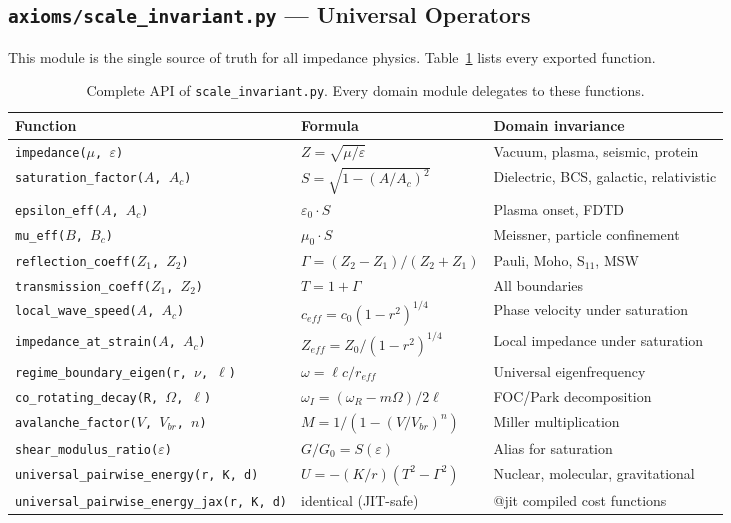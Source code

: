 \subsection{\texttt{axioms/scale\_invariant.py} --- Universal Operators}

This module is the single source of truth for all impedance physics.
Table~\ref{tab:scale_invariant_api} lists every exported function.

\begin{table}[H]
\centering\small
\caption{Complete API of \texttt{scale\_invariant.py}.
Every domain module delegates to these functions.}
\label{tab:scale_invariant_api}
\begin{tabularx}{\textwidth}{@{}lXl@{}}
\toprule
\textbf{Function} & \textbf{Formula} & \textbf{Domain invariance} \\
\midrule
\texttt{impedance($\mu$, $\varepsilon$)}
  & $Z = \sqrt{\mu/\varepsilon}$
  & Vacuum, plasma, seismic, protein \\
\texttt{saturation\_factor($A$, $A_c$)}
  & $S = \sqrt{1-(A/A_c)^2}$
  & Dielectric, BCS, galactic, relativistic \\
\texttt{epsilon\_eff($A$, $A_c$)}
  & $\varepsilon_0 \cdot S$
  & Plasma onset, FDTD \\
\texttt{mu\_eff($B$, $B_c$)}
  & $\mu_0 \cdot S$
  & Meissner, particle confinement \\
\texttt{reflection\_coeff($Z_1$, $Z_2$)}
  & $\Gamma = (Z_2-Z_1)/(Z_2+Z_1)$
  & Pauli, Moho, S$_{11}$, MSW \\
\texttt{transmission\_coeff($Z_1$, $Z_2$)}
  & $T = 1 + \Gamma$
  & All boundaries \\
\texttt{local\_wave\_speed($A$, $A_c$)}
  & $c_{eff} = c_0 (1-r^2)^{1/4}$
  & Phase velocity under saturation \\
\texttt{impedance\_at\_strain($A$, $A_c$)}
  & $Z_{eff} = Z_0 / (1-r^2)^{1/4}$
  & Local impedance under saturation \\
\texttt{regime\_boundary\_eigen(r, $\nu$, $\ell$)}
  & $\omega = \ell c / r_{eff}$
  & Universal eigenfrequency \\
\texttt{co\_rotating\_decay(R, $\Omega$, $\ell$)}
  & $\omega_I = (\omega_R - m\Omega) / 2\ell$
  & FOC/Park decomposition \\
\texttt{avalanche\_factor($V$, $V_{br}$, $n$)}
  & $M = 1/(1-(V/V_{br})^n)$
  & Miller multiplication \\
\texttt{shear\_modulus\_ratio($\varepsilon$)}
  & $G/G_0 = S(\varepsilon)$
  & Alias for saturation \\
\texttt{universal\_pairwise\_energy(r, K, d)}
  & $U = -(K/r)(T^2 - \Gamma^2)$
  & Nuclear, molecular, gravitational \\
\texttt{universal\_pairwise\_energy\_jax(r, K, d)}
  & identical (JIT-safe)
  & @jit compiled cost functions \\
\bottomrule
\end{tabularx}
\end{table}


